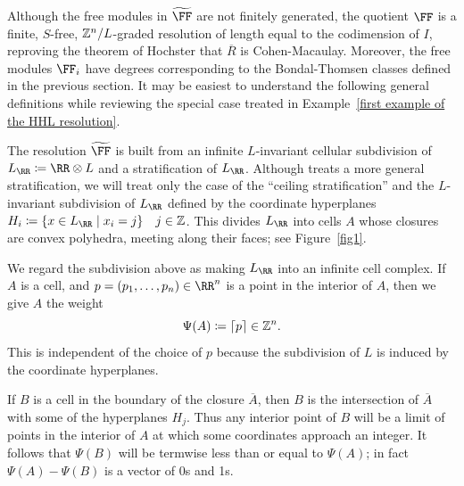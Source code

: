 \documentclass{amsart}
\begin{document}
Although the free modules in $\tF$ are not finitely generated, the quotient $\FF$
is a finite, $S$-free, $\mathbb Z^{n}/L$-graded resolution of length equal to the 
codimension of $I$, reproving the theorem of Hochster that
$\overline R$ is Cohen-Macaulay. Moreover, the free modules $\FF_{i}$ have degrees
corresponding to the Bondal-Thomsen classes defined in the previous section. It may be easiest to
understand the following general definitions while reviewing the special case treated in Example~\ref{first example of the HHL resolution}.


The resolution $\tF$ is built from an infinite $L$-invariant cellular subdivision of $L_\RR \ce \RR\otimes L$
and a stratification of $L_{\RR}$.  Although \cite{BCHSY} treats a more general stratification, we will
treat only the case of  the ``ceiling stratification'' and the $L$-invariant subdivision of $L_\RR$ defined by the coordinate hyperplanes $H_i \ce \{x\in L_\RR\mid x_i = j\}\quad j\in \ZZ$. This divides $L_\RR$ into cells $A$ whose closures are convex polyhedra, meeting along their faces; see Figure~\ref{fig1}.


We regard the subdivision above as making $L_{\RR}$ into an infinite cell complex.
If $A$ is a cell, and $p = (p_1,\dots, p_n) \in \RR^n$ is a point in the
interior of $A$, then we give $A$ the weight 
$$
\Psi(A) \coloneqq \lceil p \rceil \in \mathbb Z^{n}.
$$
This is independent of the choice of $p$ because the subdivision of $L$ is induced by the coordinate hyperplanes.
 
If $B$ is 
a cell in the boundary of the closure $\overline A$, then $B$ is the intersection of
$\overline A$ with some of the hyperplanes $H_{j}$. Thus any interior point of $B$ will
be a limit of points in the interior of $A$ at which some coordinates approach an integer. It follows that
$\Psi(B)$ will be termwise less than or equal to $\Psi(A)$; in fact $\Psi(A) - \Psi(B)$ is a vector
of 0s and 1s.
\end{document}
